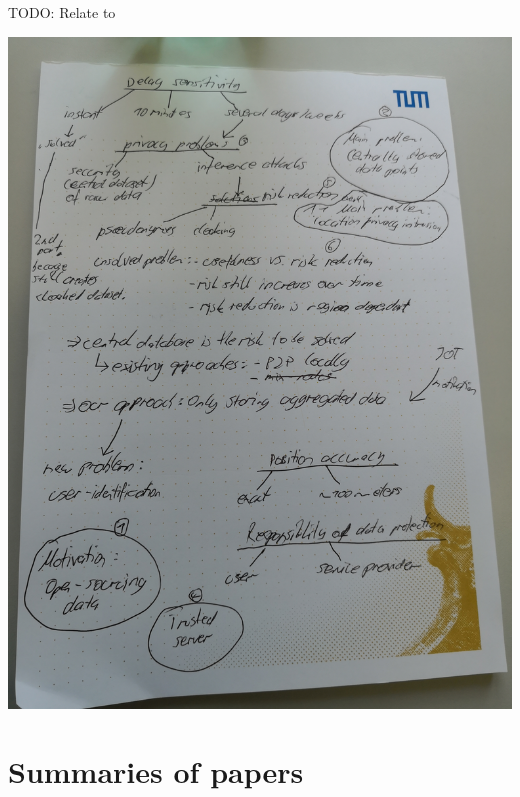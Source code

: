 TODO: Relate to \parencite{k-anonymity}

\includegraphics[width=\textwidth]{data/research-overview.jpg}

\section{Summaries of papers}

